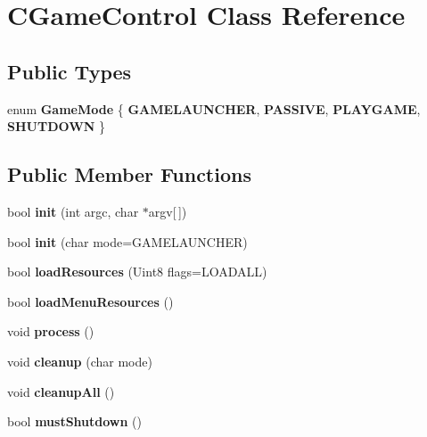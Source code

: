 \hypertarget{class_c_game_control}{
\section{CGameControl Class Reference}
\label{class_c_game_control}
}
\subsection*{Public Types}
\begin{DoxyCompactItemize}
\item 
enum {\bfseries GameMode} \{ {\bfseries GAMELAUNCHER}, 
{\bfseries PASSIVE}, 
{\bfseries PLAYGAME}, 
{\bfseries SHUTDOWN}
 \}
\end{DoxyCompactItemize}
\subsection*{Public Member Functions}
\begin{DoxyCompactItemize}
\item 
\hypertarget{class_c_game_control_ad89a5415caf3a6d24953ed0eaebb2ccd}{
bool {\bfseries init} (int argc, char $\ast$argv\mbox{[}$\,$\mbox{]})}
\label{class_c_game_control_ad89a5415caf3a6d24953ed0eaebb2ccd}

\item 
\hypertarget{class_c_game_control_ae101d0df218b98c9fac33b6742c3dac0}{
bool {\bfseries init} (char mode=GAMELAUNCHER)}
\label{class_c_game_control_ae101d0df218b98c9fac33b6742c3dac0}

\item 
\hypertarget{class_c_game_control_a26173e654771d6ef698d592cbf4f2eb7}{
bool {\bfseries loadResources} (Uint8 flags=LOADALL)}
\label{class_c_game_control_a26173e654771d6ef698d592cbf4f2eb7}

\item 
\hypertarget{class_c_game_control_afc6e3c6b0fae0e435cf12d76c53a1e23}{
bool {\bfseries loadMenuResources} ()}
\label{class_c_game_control_afc6e3c6b0fae0e435cf12d76c53a1e23}

\item 
\hypertarget{class_c_game_control_aa290063b8fa93caa7e05484c71c7b0bc}{
void {\bfseries process} ()}
\label{class_c_game_control_aa290063b8fa93caa7e05484c71c7b0bc}

\item 
\hypertarget{class_c_game_control_ac52bfc95cb6ca8f726b253829de1f1c3}{
void {\bfseries cleanup} (char mode)}
\label{class_c_game_control_ac52bfc95cb6ca8f726b253829de1f1c3}

\item 
\hypertarget{class_c_game_control_aedddd78f0494ff5b9bcab7c9a3e19ab2}{
void {\bfseries cleanupAll} ()}
\label{class_c_game_control_aedddd78f0494ff5b9bcab7c9a3e19ab2}

\item 
\hypertarget{class_c_game_control_a7420ab6ef02ea1a28e60a6070c0d8a16}{
bool {\bfseries mustShutdown} ()}
\label{class_c_game_control_a7420ab6ef02ea1a28e60a6070c0d8a16}

\end{DoxyCompactItemize}
